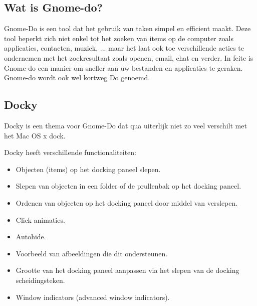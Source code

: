 \documentclass[12pt]{article} %
\begin{document}



\newpage %



\subsection{Wat is Gnome-do?} %

Gnome-Do is een tool dat het gebruik van taken simpel en efficient maakt. Deze tool beperkt zich niet enkel tot het zoeken van items op de computer zoals applicaties, contacten, muziek, ... maar het laat ook toe verschillende acties te ondernemen met het zoekresultaat zoals openen, email, chat en verder. In feite is Gnome-do een manier om sneller aan uw bestanden en applicaties te geraken. Gnome-do wordt ook wel kortweg Do genoemd. \cite{Gnome}



\newpage %


\subsection{Docky} %

Docky is een thema voor Gnome-Do dat qua uiterlijk niet zo veel verschilt met het Mac OS x dock.

\vspace{10 mm}

\setlength{\parindent}{0pt}Docky heeft verschillende functionaliteiten:

\begin{itemize}
    \item Objecten (items) op het docking paneel slepen.
    \item Slepen van objecten in een folder of de prullenbak op het docking paneel.
    \item Ordenen van objecten op het docking paneel door middel van verslepen.
    \item Click animaties.
    \item Autohide.
    \item Voorbeeld van afbeeldingen die dit ondersteunen.
    \item Grootte van het docking paneel aanpassen via het slepen van de docking scheidingsteken.
    \item Window indicators (advanced window indicators).  \cite{dock}
\end{itemize}
\end{document}
